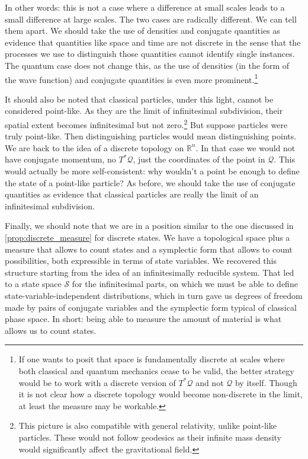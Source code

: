 \documentclass[smallextended]{svjour3}
\numberwithin{equation}{section}
\theoremstyle{definition}
\begin{document}
In other words: this is not a case where a difference at small scales leads to a small difference at large scales. The two cases are radically different. We can tell them apart. We should take the use of densities and conjugate quantities as evidence that quantities like space and time are not discrete in the sense that the processes we use to distinguish those quantities cannot identify single instances. The quantum case does not change this, as the use of densities (in the form of the wave function) and conjugate quantities is even more prominent.\footnote{If one wants to posit that space is fundamentally discrete at scales where both classical and quantum mechanics cease to be valid, the better strategy would be to work with a discrete version of $T^*\mathcal{Q}$ and not $\mathcal{Q}$ by itself. Though it is not clear how a discrete topology would become non-discrete in the limit, at least the measure may be workable.}

It should also be noted that classical particles, under this light, cannot be considered point-like. As they are the limit of infinitesimal subdivision, their spatial extent becomes infinitesimal but not zero.\footnote{This picture is also compatible with general relativity, unlike point-like particles. These would not follow geodesics as their infinite mass density would significantly affect the gravitational field.} But suppose particles were truly point-like. Then distinguishing particles would mean distinguishing points. We are back to the idea of a discrete topology on $\mathbb{R}^n$. In that case we would not have conjugate momentum, no $T^*\mathcal{Q}$, just the coordinates of the point in $\mathcal{Q}$. This would actually be more self-consistent: why wouldn't a point be enough to define the state of a point-like particle? As before, we should take the use of conjugate quantities as evidence that classical particles are really the limit of an infinitesimal subdivision.

Finally, we should note that we are in a position similar to the one discussed in \ref{prop:discrete_measure} for discrete states. We have a topological space plus a measure that allows to count states and a symplectic form that allows to count possibilities, both expressible in terms of state variables. We recovered this structure starting from the idea of an infinitesimally reducible system. That led to a state space $\mathcal{S}$ for the infinitesimal parts, on which we must be able to define state-variable-independent distributions, which in turn gave us degrees of freedom made by pairs of conjugate variables and the symplectic form typical of classical phase space. In short: being able to measure the amount of material is what allows us to count states.
\end{document}
